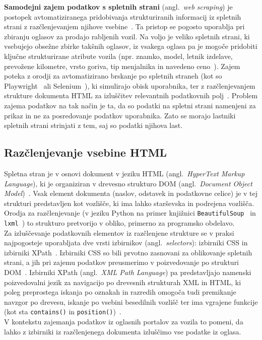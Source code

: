 \documentclass[a4paper,12pt,openright]{book}
\begin{document}
\textbf{Samodejni zajem podatkov s spletnih strani} (angl.\ \emph{web scraping}) je postopek avtomatiziranega
pridobivanja strukturiranih informacij iz spletnih strani z razčlenjevanjem
njihove vsebine~\cite{laender2002}. Ta pristop se pogosto uporablja pri zbiranju
oglasov za prodajo rabljenih vozil. Na voljo je veliko spletnih strani, ki
vsebujejo obsežne zbirke takšnih oglasov, iz vsakega oglasa pa je mogoče
pridobiti ključne strukturirane atribute vozila (npr. znamko, model, letnik
izdelave, prevožene kilometre, vrsto goriva, tip menjalnika in navedeno ceno~\cite{gegic2019car}).
 Zajem poteka z orodji za avtomatizirano
brskanje po spletnih straneh (kot so Playwright~\cite{playwright-docs} ali Selenium~\cite{selenium-docs}), ki simulirajo obisk uporabnika, ter z
razčlenjevanjem strukture dokumenta HTML za izluščitev relevantnih
podatkovnih polj~\cite{laender2002}. Problem zajema podatkov na tak način je ta,
da so podatki na spletni strani namenjeni za prikaz in ne za posredovanje podatkov uporabnika. Zato
 se morajo lastniki spletnih strani strinjati z tem, saj so podatki njihova last.

\subsection{Razčlenjevanje vsebine HTML}

Spletna stran je v osnovi dokument v jeziku HTML
(angl.\ \emph{HyperText Markup Language}), ki je organiziran v drevesno strukturo
DOM (angl.\ \emph{Document Object Model})~\cite{olston2010}. Vsak element
dokumenta (naslov, odstavek in podatkovne celice) je v tej strukturi
predstavljen kot vozlišče, ki ima lahko starševska in podrejena vozlišča.
Orodja za razčlenjevanje (v jeziku Python na primer knjižnici
\texttt{BeautifulSoup}~\cite{beautifulsoup-docs} in \texttt{lxml}~\cite{lxml-docs}) to strukturo pretvorijo
v obliko, primerno za programsko obdelavo.\\
Za izluščevanje podatkovnih elementov iz razčlenjene strukture se v praksi
najpogosteje uporabljata dve vrsti izbirnikov (angl.\ \emph{selectors}): izbirniki CSS in izbirniki XPath~\cite{darmawan2022}.
 Izbirniki CSS so bili prvotno zasnovani za oblikovanje
spletnih strani, a jih pri zajemu podatkov preusmerimo v poizvedovanje po
strukturi DOM~\cite{olston2010}. Izbirniki XPath (angl.\ \emph{XML Path
Language}) pa predstavljajo namenski poizvedovalni jezik za navigacijo po drevesnih
strukturah XML in HTML, ki poleg preprostega iskanja po oznakah in razredih
omogoča tudi premikanje navzgor po drevesu, iskanje po vsebini besedilnih
vozlišč ter ima vgrajene funkcije (kot sta \texttt{contains()} in
\texttt{position()})~\cite{darmawan2022}.\\
V kontekstu zajemanja podatkov iz
oglasnih portalov za vozila to pomeni, da lahko z izbirniki iz razčlenjenega
dokumenta izluščimo vse podatke iz oglasa.
\end{document}
